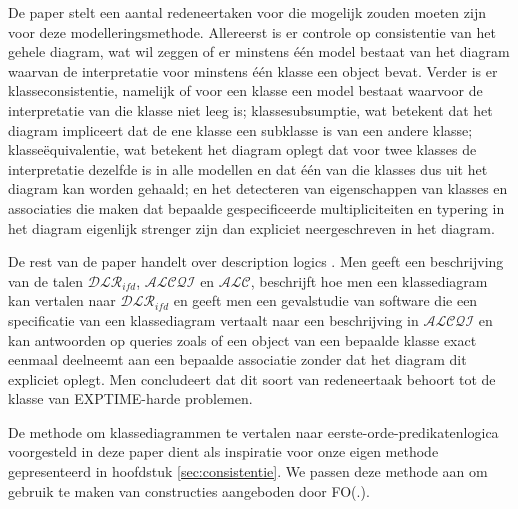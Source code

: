 De paper stelt een aantal redeneertaken voor die mogelijk zouden moeten zijn voor deze modelleringsmethode. Allereerst is er controle op consistentie van het gehele diagram, wat wil zeggen of er minstens \'e\'en model bestaat van het diagram waarvan de interpretatie voor minstens \'e\'en klasse een object bevat. Verder is er klasseconsistentie, namelijk of voor een klasse een model bestaat waarvoor de interpretatie van die klasse niet leeg is; klassesubsumptie, wat betekent dat het diagram impliceert dat de ene klasse een subklasse is van een andere klasse; klasse\"equivalentie, wat betekent het diagram oplegt dat voor twee klasses de interpretatie dezelfde is in alle modellen en dat \'e\'en van die klasses dus uit het diagram kan worden gehaald; en het detecteren van eigenschappen van klasses en associaties die maken dat bepaalde gespecificeerde multipliciteiten en typering in het diagram eigenlijk strenger zijn dan expliciet neergeschreven in het diagram.

De rest van de paper handelt over description logics . Men geeft een beschrijving van de talen $\mathcal{DLR}_{ifd}$, $\mathcal{ALCQI}$ en $\mathcal{ALC}$, beschrijft hoe men een klassediagram kan vertalen naar $\mathcal{DLR}_{ifd}$ en geeft men een gevalstudie van software die een specificatie van een klassediagram vertaalt naar een beschrijving in $\mathcal{ALCQI}$ en kan antwoorden op queries zoals of een object van een bepaalde klasse exact eenmaal deelneemt aan een bepaalde associatie zonder dat het diagram dit expliciet oplegt. Men concludeert dat dit soort van redeneertaak behoort tot de klasse van EXPTIME-harde problemen.

De methode om klassediagrammen te vertalen naar eerste-orde-predikatenlogica voorgesteld in deze paper dient als inspiratie voor onze eigen methode gepresenteerd in hoofdstuk \ref{sec:consistentie}. We passen deze methode aan om gebruik te maken van constructies aangeboden door FO(.)\cite{DeCatBroes2014PLaa}.

